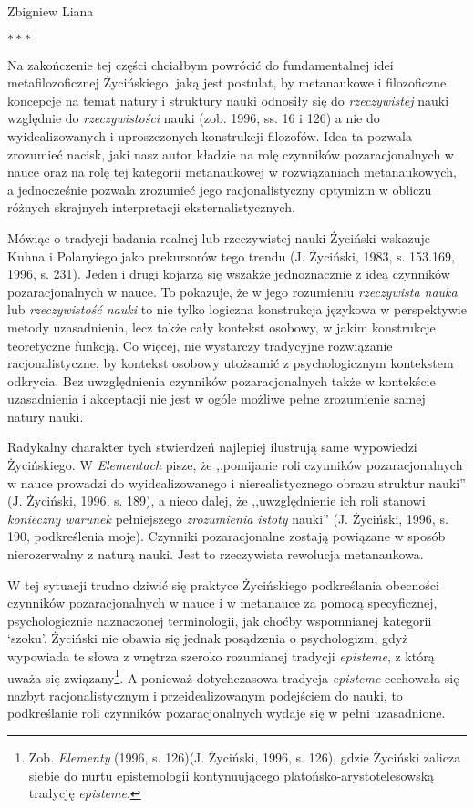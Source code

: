 \begin{artplenv}{Zbigniew Liana}
\medskip
{\centering$\ast\ast\ast$\par}
\smallskip


Na zakończenie tej części chciałbym powrócić do fundamentalnej idei metafilozoficznej Życińskiego, jaką jest postulat,
by metanaukowe i filozoficzne koncepcje na temat natury i struktury nauki odnosiły się do \textit{rzeczywistej} nauki
względnie do \textit{rzeczywistości} nauki (zob. 1996, ss. 16 i 126) a nie do wyidealizowanych i uproszczonych
konstrukcji filozofów. Idea ta pozwala zrozumieć nacisk, jaki nasz autor kładzie na rolę czynników pozaracjonalnych w
nauce oraz na rolę tej kategorii metanaukowej w rozwiązaniach metanaukowych, a jednocześnie pozwala zrozumieć jego
racjonalistyczny optymizm w obliczu różnych skrajnych interpretacji eksternalistycznych.

Mówiąc o tradycji badania realnej lub rzeczywistej nauki Życiński wskazuje Kuhna i Polanyiego jako prekursorów tego
trendu \label{ref:RNDi6TPvuVUK4}(J. Życiński, 1983, s. 153.169, 1996, s. 231). Jeden i drugi kojarzą się wszakże
jednoznacznie z ideą czynników pozaracjonalnych w nauce. To pokazuje, że w jego rozumieniu \textit{rzeczywista nauka} lub
\textit{rzeczywistość nauki} to nie tylko logiczna konstrukcja językowa w perspektywie metody uzasadnienia, lecz także
cały kontekst osobowy, w jakim konstrukcje teoretyczne funkcją. Co więcej, nie wystarczy tradycyjne rozwiązanie
racjonalistyczne, by kontekst osobowy utożsamić z psychologicznym kontekstem odkrycia. Bez uwzględnienia czynników
pozaracjonalnych także w kontekście uzasadnienia i akceptacji nie jest w ogóle możliwe pełne zrozumienie samej natury
nauki.

Radykalny charakter tych stwierdzeń najlepiej ilustrują same wypowiedzi Życińskiego. W \textit{Elementach} pisze, że
,,pomijanie roli czynników pozaracjonalnych w nauce prowadzi do wyidealizowanego i nierealistycznego obrazu struktur
nauki'' \label{ref:RND07iSFRLobf}(J. Życiński, 1996, s. 189), a nieco dalej, że ,,uwzględnienie ich roli stanowi
\textit{konieczny warunek} pełniejszego \textit{zrozumienia istoty} nauki'' \label{ref:RNDVV3U1jSC9D}(J. Życiński, 1996, s.
190, podkreślenia moje).  Czynniki pozaracjonalne zostają powiązane w sposób nierozerwalny z naturą nauki. Jest to
rzeczywista rewolucja metanaukowa.

W tej sytuacji trudno dziwić się praktyce Życińskiego podkreślania obecności czynników pozaracjonalnych w nauce i w
metanauce za pomocą specyficznej, psychologicznie naznaczonej terminologii, jak choćby wspomnianej kategorii ‘szoku’.
Życiński nie obawia się jednak posądzenia o psychologizm, gdyż wypowiada te słowa z wnętrza szeroko rozumianej tradycji
\textit{episteme}, z którą uważa się związany\footnote{Zob. \textit{Elementy} (1996, s. 126)\label{ref:RNDxQIHHr1tkz}(J.
	Życiński, 1996, s. 126), gdzie Życiński zalicza siebie do nurtu epistemologii kontynuującego platońsko-arystotelesowską
	tradycję \textit{episteme}.}. A ponieważ dotychczasowa tradycja \textit{episteme} cechowała się nazbyt racjonalistycznym i
przeidealizowanym podejściem do nauki, to podkreślanie roli czynników pozaracjonalnych wydaje się w pełni uzasadnione.


\end{artplenv}

